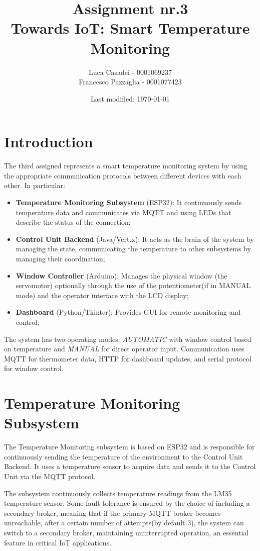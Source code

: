 \documentclass[a4paper]{article}
\author{Luca Casadei - 0001069237\\Francesco Pazzaglia - 0001077423}
\date{Last modified: \today}
\title{\textbf{Assignment nr.3\\Towards IoT: Smart Temperature Monitoring}}
\begin{document}
	\maketitle
	\tableofcontents
	
	\section{Introduction}
	The third assigned represents a smart temperature monitoring system by using the appropriate communication protocols between different devices with each other. In particular:
	
	\begin{itemize}
		\item \textbf{Temperature Monitoring Subsystem} (ESP32): It continuously sends temperature data and communicates via MQTT and using LEDs that describe the status of the connection;
		\item \textbf{Control Unit Backend} (Java/Vert.x): It acts as the brain of the system by managing the state, communicating the temperature to other subsystems by managing their coordination;
		\item \textbf{Window Controller} (Arduino): Manages the physical window (the servomotor) optionally through the use of the potentiometer(if in MANUAL mode) and the operator interface with the LCD display;
		\item \textbf{Dashboard} (Python/Tkinter): Provides GUI for remote monitoring and control;
	\end{itemize}
	
	The system has two operating modes: \textit{AUTOMATIC} with window control based on temperature and \textit{MANUAL} for direct operator input. Communication uses MQTT for thermometer data, HTTP for dashboard updates, and serial protocol for window control.
	
	\section{Temperature Monitoring Subsystem}
	The Temperature Monitoring subsystem is based on ESP32 and is responsible for continuously sending the temperature of the environment to the Control Unit Backend. It uses a temperature sensor to acquire data and sends it to the Control Unit via the MQTT protocol.
	
	The subsystem continuously collects temperature readings from the LM35 temperature sensor.  Some fault tolerance is ensured by the choice of including a secondary broker, meaning that if the primary MQTT broker becomes unreachable, after a certain number of attempts(by default 3), the system can switch to a secondary broker, maintaining uninterrupted operation, an essential feature in critical IoT applications.
	
\end{document}
